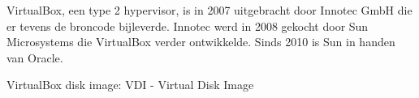 VirtualBox, een type 2 hypervisor, is in 2007 uitgebracht door Innotec GmbH die er tevens de broncode bijleverde. Innotec werd in 2008 gekocht door Sun Microsystems die VirtualBox verder ontwikkelde. Sinds 2010 is Sun in handen van Oracle.

VirtualBox disk image: VDI - Virtual Disk Image

